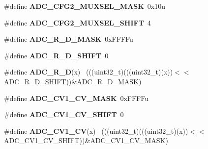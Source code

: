 \begin{DoxyCompactItemize}
\item 
\hypertarget{group___a_d_c___register___masks_ga5c50199c9b27cb92554a647909c6338a}{}\#define {\bfseries A\+D\+C\+\_\+\+C\+F\+G2\+\_\+\+M\+U\+X\+S\+E\+L\+\_\+\+M\+A\+S\+K}~0x10u\label{group___a_d_c___register___masks_ga5c50199c9b27cb92554a647909c6338a}

\item 
\hypertarget{group___a_d_c___register___masks_ga3d74b5bda99558af8b4f0e986ef7ea9b}{}\#define {\bfseries A\+D\+C\+\_\+\+C\+F\+G2\+\_\+\+M\+U\+X\+S\+E\+L\+\_\+\+S\+H\+I\+F\+T}~4\label{group___a_d_c___register___masks_ga3d74b5bda99558af8b4f0e986ef7ea9b}

\item 
\hypertarget{group___a_d_c___register___masks_ga7dadc81f58826b303fb83918820cd177}{}\#define {\bfseries A\+D\+C\+\_\+\+R\+\_\+\+D\+\_\+\+M\+A\+S\+K}~0x\+F\+F\+F\+Fu\label{group___a_d_c___register___masks_ga7dadc81f58826b303fb83918820cd177}

\item 
\hypertarget{group___a_d_c___register___masks_ga8e2365e522772584a5ee2dd6a8b0987a}{}\#define {\bfseries A\+D\+C\+\_\+\+R\+\_\+\+D\+\_\+\+S\+H\+I\+F\+T}~0\label{group___a_d_c___register___masks_ga8e2365e522772584a5ee2dd6a8b0987a}

\item 
\hypertarget{group___a_d_c___register___masks_gac290b62bcc12e9558deed30ee02b3208}{}\#define {\bfseries A\+D\+C\+\_\+\+R\+\_\+\+D}(x)                                                          ~(((uint32\+\_\+t)(((uint32\+\_\+t)(x))$<$$<$A\+D\+C\+\_\+\+R\+\_\+\+D\+\_\+\+S\+H\+I\+F\+T))\&A\+D\+C\+\_\+\+R\+\_\+\+D\+\_\+\+M\+A\+S\+K)\label{group___a_d_c___register___masks_gac290b62bcc12e9558deed30ee02b3208}

\item 
\hypertarget{group___a_d_c___register___masks_gad67c3b5f385cd9b26be8257134e1e3cf}{}\#define {\bfseries A\+D\+C\+\_\+\+C\+V1\+\_\+\+C\+V\+\_\+\+M\+A\+S\+K}~0x\+F\+F\+F\+Fu\label{group___a_d_c___register___masks_gad67c3b5f385cd9b26be8257134e1e3cf}

\item 
\hypertarget{group___a_d_c___register___masks_ga1925520ab1dd2eb81e0e4505af905c13}{}\#define {\bfseries A\+D\+C\+\_\+\+C\+V1\+\_\+\+C\+V\+\_\+\+S\+H\+I\+F\+T}~0\label{group___a_d_c___register___masks_ga1925520ab1dd2eb81e0e4505af905c13}

\item 
\hypertarget{group___a_d_c___register___masks_ga9bf037e1e55f3cda8a60192a483df312}{}\#define {\bfseries A\+D\+C\+\_\+\+C\+V1\+\_\+\+C\+V}(x)                                                    ~(((uint32\+\_\+t)(((uint32\+\_\+t)(x))$<$$<$A\+D\+C\+\_\+\+C\+V1\+\_\+\+C\+V\+\_\+\+S\+H\+I\+F\+T))\&A\+D\+C\+\_\+\+C\+V1\+\_\+\+C\+V\+\_\+\+M\+A\+S\+K)\label{group___a_d_c___register___masks_ga9bf037e1e55f3cda8a60192a483df312}


\end{DoxyCompactItemize}
